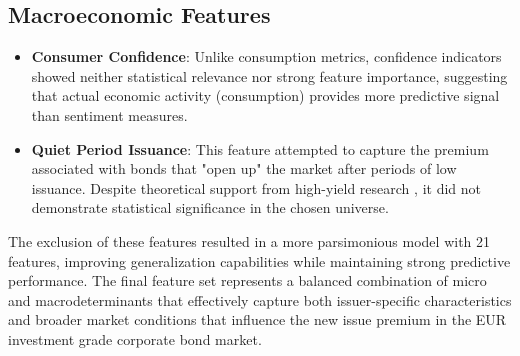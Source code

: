 \subsection{Macroeconomic Features}

\begin{itemize}
    \item \textbf{Consumer Confidence}: Unlike consumption metrics, confidence indicators showed neither statistical relevance nor strong feature importance, suggesting that actual economic activity (consumption) provides more predictive signal than sentiment measures.
    \item \textbf{Quiet Period Issuance}: This feature attempted to capture the premium associated with bonds that "open up" the market after periods of low issuance. Despite theoretical support from high-yield research \parencite{Geerts2022PredictingYield}, it did not demonstrate statistical significance in the chosen universe.
\end{itemize}

The exclusion of these features resulted in a more parsimonious model with 21 features, improving generalization capabilities while maintaining strong predictive performance. The final feature set represents a balanced combination of micro and macrodeterminants that effectively capture both issuer-specific characteristics and broader market conditions that influence the new issue premium in the EUR investment grade corporate bond market.